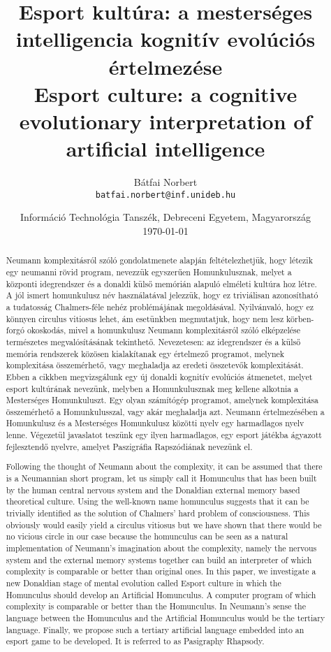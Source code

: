 \documentclass[a4paper]{article}
\title{Esport kultúra: a mesterséges intelligencia kognitív evolúciós értelmezése\\Esport culture: a cognitive evolutionary interpretation of artificial intelligence}
\author{
	Bátfai Norbert\\
	\texttt{batfai.norbert@inf.unideb.hu}}
\date{
    Információ Technológia Tanszék, Debreceni Egyetem, Magyarország\\
    \today
}
\begin{document}
\maketitle

{
\begin{abstract}
Neumann komplexitásról szóló gondolatmenete alapján fel\-té\-te\-lez\-het\-jük, hogy létezik egy neumanni rövid program, nevezzük egyszerűen Homunkulusznak, melyet a központi idegrendszer és a donaldi külső me\-mó\-ri\-án alapuló elméleti kultúra hoz létre. A jól ismert homunkulusz név hasz\-ná\-la\-tá\-val jelezzük, hogy ez triviálisan azonosítható a tudatosság Chalmers-féle nehéz problémájának megoldásával. Nyilvánvaló, hogy ez könnyen circulus vitiosus lehet, ám esetünkben megmutatjuk, hogy nem lesz körben-forgó okoskodás, mivel a homunkulusz Neumann komplexitásról szóló elképzelése természetes megvalósításának tekinthető. Nevezetesen: az idegrendszer és a külső memória rendszerek közösen kialakítanak egy értelmező programot, melynek komplexitása összemérhető, vagy meghaladja az eredeti összetevők komplexitását. Ebben a cikkben megvizsgálunk egy új donaldi kognitív evolúciós átmenetet, melyet esport kultúrának nevezünk, melyben a Homunkulusznak meg kellene alkotnia a Mesterséges Homunkuluszt. Egy olyan számítógép programot, amelynek komplexitása összemérhető a Homunkulusszal, vagy akár meghaladja azt. Neumann értelmezésében a Homunkulusz és a Mesterséges Homunkulusz közötti nyelv egy harmadlagos nyelv lenne. Végezetül javaslatot teszünk egy ilyen harmadlagos, egy esport játékba ágyazott fejlesztendő nyelvre, amelyet Paszigráfia Rapszódiának nevezünk el.
\end{abstract}
}
  
{
\begin{abstract}
Following the thought of Neumann about the complexity, it can be assumed that there is a Neumannian short program, let us simply call it Homunculus that has been built by the human central nervous system and the Donaldian external memory based theoretical culture. Using the well-known name homunculus suggests that it can be trivially identified as the solution of Chalmers' hard problem of consciousness. This obviously would easily yield a circulus vitiosus but we have shown that there would be no vicious circle in our case because the homunculus can be seen as a natural implementation of Neumann's imagination about the complexity, namely the nervous system and the external memory systems together can build an interpreter of which complexity is comparable or better than original ones. In this paper, we investigate a new Donaldian stage of mental evolution called Esport culture in which the Homunculus should develop an Artificial Homunculus. A computer program of which complexity is comparable or better than the Homunculus. In Neumann's sense the language between the Homunculus and the Artificial Homunculus would be the tertiary language. Finally, we propose such a tertiary artificial language embedded into an esport game to be developed. It is referred to as Pasigraphy Rhapsody.
\end{abstract}
}
\end{document}
